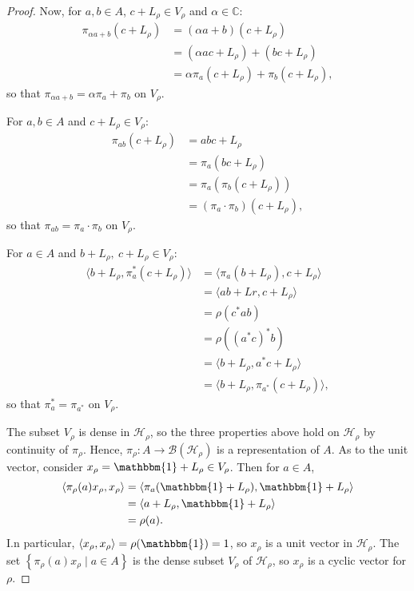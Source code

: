 \documentclass[11pt,a4paper]{report}
\theoremstyle{plain}
\theoremstyle{definition}
\newcommand{\1}{\mathbbm{1}}
\newcommand{\B}{\mathcal{B}}
\newcommand{\Hr}{\mathcal{H}_\rho}
\newcommand{\Vr}{V_\rho}
\newcommand{\Lr}{L_\rho}
\newcommand{\xr}{x_\rho}
\begin{document}
\begin{proof}
	
	Now, for $a,b \in A$, $c+ L_\rho \in \Vr$ and $\alpha \in \mathbb{C}$:
	\begin{align*}
				\pi_{\alpha a+b}(c+\Lr)
		&=		(\alpha a+b) (c+\Lr)													\\
		&=		(\alpha ac +\Lr) + (bc+\Lr)												\\
		&=		\alpha \pi_a (c+\Lr) + \pi_b(c+\Lr),
	\end{align*}
	so that $\pi_{\alpha a + b} = \alpha \pi_a +\pi_b$ on $\Vr$.
	
	For $a,b \in A$ and $c+ L_\rho \in \Vr$:
	\begin{align*}
		\pi_{ab}(c+\Lr)
		&=		abc+\Lr																	\\
		&=		\pi_a (bc+\Lr)															\\
		&=		\pi_a (\pi_b (c+\Lr))													\\
		&=		(\pi_a \cdot \pi_b) (c+\Lr),
	\end{align*}
	so that $\pi_{a b} = \pi_a \cdot \pi_b$ on $\Vr$.
	
	For $a\in A$ and $b+ L_\rho,~c+ L_\rho \in \Vr$:
	\begin{align*}
				\langle b+\Lr, \pi_a^\ast (c+\Lr) \rangle 
		&=		\langle \pi_a (b+\Lr), c+\Lr \rangle									\\
		&=		\langle ab +Lr, c+\Lr \rangle											\\
		&=		\rho(c^\ast ab)															\\
		&=		\rho((a^\ast c)^\ast b)													\\
		&=		\langle b+\Lr, a^\ast c+\Lr \rangle										\\
		&=		\langle b+\Lr, \pi_{a^\ast}(c+\Lr)\rangle,
	\end{align*}
	so that $ \pi_a^\ast = \pi_{a^\ast}$ on $\Vr$.
	
	The subset $\Vr$ is dense in $\Hr$, so the three properties above hold on $\Hr$ 
	by continuity of $\pi_\rho$. Hence, $\pi_\rho: A \to \B(\Hr)$ is a 
	representation of $A$. As to the unit vector, consider $\xr = \1 + \Lr \in \Vr$. 
	Then for $a \in A$,
	\begin{align*}
				\langle \pi_\rho(a)\xr ,\xr \rangle 
		&=		\langle \pi_a(\1+\Lr), \1+\Lr \rangle									\\
		&=		\langle a+\Lr, \1+\Lr \rangle											\\
		&=		\rho(a).
	\end{align*}
	I.n particular, $\langle \xr,\xr \rangle = \rho (\1) = 1$, so $\xr$ is a unit 
	vector in $\Hr$. The set $\left\{\pi_\rho(a)x_\rho \mid a\in A\right\}$ is the 
	dense subset $\Vr$ of $\Hr$, so $x_\rho$ is a cyclic vector for $\rho$.
\end{proof}
\end{document}
